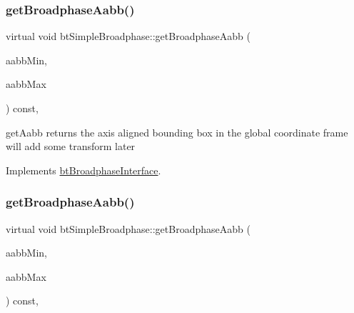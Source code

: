\mbox{\label{classbtSimpleBroadphase_a4e8e5de5df6d3125631e3d94a67ac4d2}} 
\subsubsection{\texorpdfstring{get\+Broadphase\+Aabb()}{getBroadphaseAabb()}\hspace{0.1cm}{\footnotesize\ttfamily [1/2]}}
{\footnotesize\ttfamily virtual void bt\+Simple\+Broadphase\+::get\+Broadphase\+Aabb (\begin{DoxyParamCaption}\item[{bt\+Vector3 \&}]{aabb\+Min,  }\item[{bt\+Vector3 \&}]{aabb\+Max }\end{DoxyParamCaption}) const\hspace{0.3cm}{\ttfamily [inline]}, {\ttfamily [virtual]}}

get\+Aabb returns the axis aligned bounding box in the \textquotesingle{}global\textquotesingle{} coordinate frame will add some transform later 

Implements \hyperlink{classbtBroadphaseInterface_ab5af9e26414f5a72a76040b8fab4d9e2}{bt\+Broadphase\+Interface}.

\mbox{\label{classbtSimpleBroadphase_a4e8e5de5df6d3125631e3d94a67ac4d2}} 
\subsubsection{\texorpdfstring{get\+Broadphase\+Aabb()}{getBroadphaseAabb()}\hspace{0.1cm}{\footnotesize\ttfamily [2/2]}}
{\footnotesize\ttfamily virtual void bt\+Simple\+Broadphase\+::get\+Broadphase\+Aabb (\begin{DoxyParamCaption}\item[{bt\+Vector3 \&}]{aabb\+Min,  }\item[{bt\+Vector3 \&}]{aabb\+Max }\end{DoxyParamCaption}) const\hspace{0.3cm}{\ttfamily [inline]}, {\ttfamily [virtual]}}

